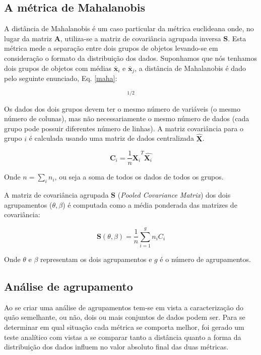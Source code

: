 \subsection{A métrica de Mahalanobis}

A distância de Mahalanobis é um caso particular da métrica euclideana onde, no lugar da matriz $\textbf{A}$, utiliza-se a matriz de covariância agrupada inversa $\textbf{S}$. Esta métrica mede a separação entre dois grupos de objetos levando-se em consideração o formato da distribuição dos dados. Suponhamos que nós tenhamos dois grupos de objetos com médias $\bar{\textbf{x}}_{i}$ e $\bar{\textbf{x}}_{j}$, a distância de Mahalanobis é dado pelo seguinte enunciado, Eq. \ref{maha}:

\begin{equation}
[(\bar{\textbf{x}_{i}}-\bar{\textbf{x}}_{j})^{T}\textbf{S}^{-1}(\bar{\textbf{y}}_{i}-\bar{\textbf{y}}_{j})]^{1/2}
\label{maha}
\end{equation}

Os dados dos dois grupos devem ter o mesmo número de variáveis (o mesmo número de colunas), mas não necessariamente o mesmo número de dados (cada grupo pode possuir diferentes número de linhas). A matriz covariância para o grupo $i$ é calculada usando uma matriz de dados centralizada $\hat{\textbf{X}}$.


\begin{equation}
\textbf{C}_{i}=\dfrac{1}{n} \hat{\textbf{X}_{i}}^{T}\hat{\textbf{X}_{i}}
\end{equation}

Onde $n=\sum_{i} n_{i}$, ou seja a soma de todos os dados de todos os grupos. 


A matriz de covariância agrupada $\textbf{S}$ (\textit{Pooled Covariance Matrix}) dos dois agrupamentos ($\theta, \beta$) é computada como a média ponderada das matrizes de covariância:

\begin{equation}
\textbf{S}(\theta, \beta)=\dfrac{1}{n}\sum^{g}_{i=1}n_{i}C_{i}
\end{equation}

Onde $\theta$ e $\beta$ representam os dois agrupamentos e $g$ é o número de agrupamentos.


\subsection{Análise de agrupamento}
\label{teste}

Ao se criar uma análise de agrupamentos tem-se em vista a caracterização do quão semelhante, ou não, dois ou mais conjuntos de dados podem ser.  Para se determinar em qual situação cada métrica se comporta melhor, foi gerado um teste analítico com vistas a se comparar tanto a distância quanto a forma da distribuição dos dados influem no valor absoluto final das duas métricas. 

